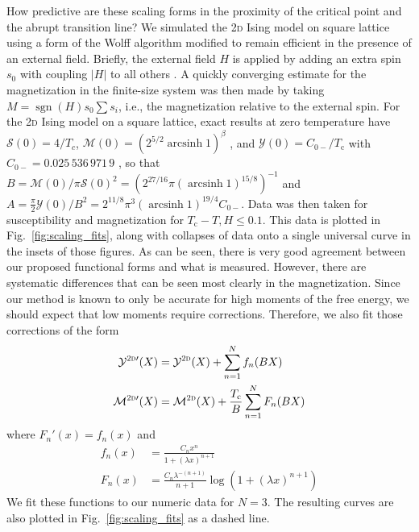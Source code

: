 \documentclass[aps,prl,reprint]{revtex4-1}
\def\arcsinh{\mathop{\mathrm{arcsinh}}\nolimits}
\def\sgn{\mathop{\mathrm{sgn}}\nolimits}
\def\c{\mathrm c}
\def\fM{\mathcal M}  %
\def\fX{\mathcal Y}  %
\def\fS{\mathcal S}  %
\def\twodee{\textsc{2d} }
\begin{document}
How predictive are these scaling forms in the proximity of the critical point
and the abrupt transition line? We simulated the \twodee Ising model on square lattice using a form of the Wolff algorithm modified
to remain efficient in the presence of an external field. Briefly, the external field $H$ is applied by adding an extra spin $s_0$ with coupling $|H|$ to all others
\cite{dimitrovic.1991.finite}. A quickly converging estimate for the magnetization in the finite-size system was then made by taking $M=\sgn(H)s_0\sum s_i$, i.e., the magnetization relative to the external spin. For the \twodee Ising model on a square lattice, exact results at zero temperature have $\fS(0)=4/T_c$, $\fM(0)=(2^{5/2}\arcsinh1)^\beta$ \cite{onsager.1944.crystal}, and $\fX(0)=C_{0-}/T_\c$ with $C_{0-}=0.025\,536\,971\,9$
\cite{barouch.1973.susceptibility}, so that $B=\fM(0)/\pi\fS(0)^2=(2^{27/16}\pi(\arcsinh1)^{15/8})^{-1}$ and $A=\frac\pi2\fX(0)/B^2=2^{11/8}\pi^3(\arcsinh1)^{19/4}C_{0-}$. 
Data was then taken for susceptibility and
magnetization for $T_\c-T,H\leq0.1$. This data is plotted in
Fig.~\ref{fig:scaling_fits}, along with collapses of data onto a single universal curve
in the insets of those figures. As can be seen, there is very good agreement
between our proposed functional forms and what is measured.
However, there are systematic differences that can be seen most clearly in the
magnetization. Since our method is known to only be accurate for high moments
of the free energy, we should expect that low moments require corrections.
Therefore, we also fit those corrections of the form
\begin{align}
  \fX^{\twodee\prime}(X)&=\fX^\twodee(X)+\sum_{n=1}^Nf_n(BX)\\
  \fM^{\twodee\prime}(X)&=\fM^\twodee(X)+\frac{T_\c}B\sum_{n=1}^NF_n(BX)
\end{align}
where $F_n'(x)=f_n(x)$ and
\begin{align}
  f_n(x)&=\frac{C_nx^n}{1+(\lambda x)^{n+1}}\\
  F_n(x)&=\frac{C_n\lambda^{-(n+1)}}{n+1}\log(1+(\lambda x)^{n+1})
\end{align}
We fit these functions to our numeric data for $N=3$. The resulting curves are
also plotted in Fig.~\ref{fig:scaling_fits} as a dashed line.
\end{document}
